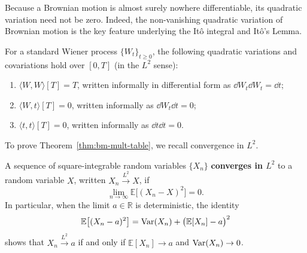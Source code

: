 Because a Brownian motion is almost surely nowhere differentiable, its quadratic variation need not be zero. Indeed, the non-vanishing quadratic variation of Brownian motion is the key feature underlying the It\^o integral and It\^o's Lemma.

\begin{theorem}
\label{thm:bm-mult-table}
For a standard Wiener process $\{W_t\}_{t \ge 0}$, the following quadratic variations and covariations hold over $[0, T]$ (in the $L^2$ sense):
\begin{enumerate}
    \item $\langle W, W \rangle[T] = T$, written informally in differential form as $\dd W_t \dd W_t = \dd t$;
    \item $\langle W, t \rangle[T] = 0$, written informally as $\dd W_t \dd t = 0$;
    \item $\langle t, t \rangle[T] = 0$, written informally as $\dd t \dd t = 0$.
\end{enumerate}
\end{theorem}

To prove Theorem~\ref{thm:bm-mult-table}, we recall convergence in $L^2$.

\begin{definition}[Convergence in $L^2$]
\label{def:l2-convergence}
A sequence of square-integrable random variables $\{X_n\}$ \textbf{converges in $L^2$} to a random variable $X$, written $X_n \xrightarrow{L^2} X$, if
\[
\lim_{n \to \infty} \mathbb{E}\big[(X_n - X)^2\big] = 0.
\]
In particular, when the limit $a \in \mathbb{R}$ is deterministic, the identity
\[
\mathbb{E}\big[(X_n - a)^2\big] = \operatorname{Var}(X_n) + \big(\mathbb{E}[X_n] - a\big)^2
\]
shows that $X_n \xrightarrow{L^2} a$ if and only if $\mathbb{E}[X_n] \to a$ and $\operatorname{Var}(X_n) \to 0$.
\end{definition}

